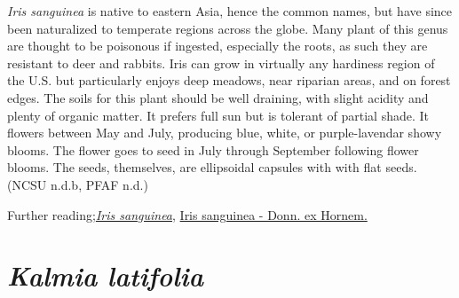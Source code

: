 \documentclass[
]{article}
\begin{document}
\emph{Iris sanguinea} is native to eastern Asia, hence the common names, but have since been naturalized to temperate regions across the globe. Many plant of this genus are thought to be poisonous if ingested, especially the roots, as such they are resistant to deer and rabbits. Iris can grow in virtually any hardiness region of the U.S. but particularly enjoys deep meadows, near riparian areas, and on forest edges. The soils for this plant should be well draining, with slight acidity and plenty of organic matter. It prefers full sun but is tolerant of partial shade. It flowers between May and July, producing blue, white, or purple-lavendar showy blooms. The flower goes to seed in July through September following flower blooms. The seeds, themselves, are ellipsoidal capsules with with flat seeds. (NCSU n.d.b, PFAF n.d.)

Further reading;\href{https://plants.ces.ncsu.edu/plants/iris-sanguinea/}{\emph{Iris sanguinea}},
\href{https://pfaf.org/user/Plant.aspx?LatinName=Iris+sanguinea}{Iris sanguinea - Donn. ex Hornem.}

\hypertarget{kalmia-latifolia}{%
\section{\texorpdfstring{\emph{Kalmia latifolia}}{Kalmia latifolia}}\label{kalmia-latifolia}}
\end{document}
